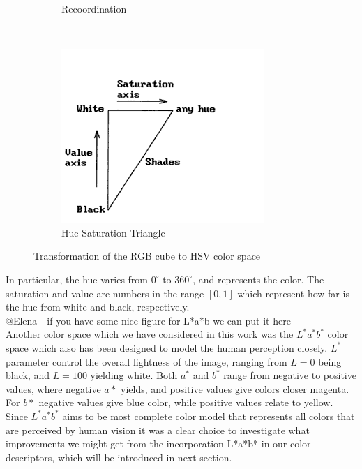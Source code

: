 \documentclass{report}
\begin{document}
\begin{figure}[hbtp]
\begin{subfigure}[b]{0.3\textwidth}
                \caption{Recoordination}
                \label{fig:mouse}
        \end{subfigure}
        ~
        \begin{subfigure}[b]{0.3\textwidth}
                \includegraphics[width=\textwidth]{graphics/hsv_rescale2.png}
                \caption{Hue-Saturation Triangle}
                \label{fig:tiger}
        \end{subfigure}
        \caption{Transformation of the RGB cube to HSV color space}\label{fig:hsv_visualisation}
\end{figure}

In particular, the hue varies from $0^{\circ}$ to $360^{\circ}$, and represents the color. The saturation and value are numbers in the range $[0,1]$ which represent how far is the hue from white and black, respectively. \\

{\color{red} @Elena - if you have some nice figure for L*a*b we can put it here}\\

Another color space which we have considered in this work was the $L^*a^*b^*$ color space which also has been designed to model the human perception closely. $L^*$ parameter control the overall lightness of the image, ranging from $L=0$ being black, and $L=100$ yielding white. Both $a^*$ and $b^*$ range from negative to positive values, where negative $a*$ yields, and positive values give colors closer magenta. For $b*$ negative values give blue color, while positive values relate to yellow. Since $L^*a^*b^*$ aims to be most complete color model that represents all colors that are perceived by human vision it was a clear choice to investigate what improvements we might get from the incorporation L*a*b* in our color descriptors, which will be introduced in next section.
\end{document}
